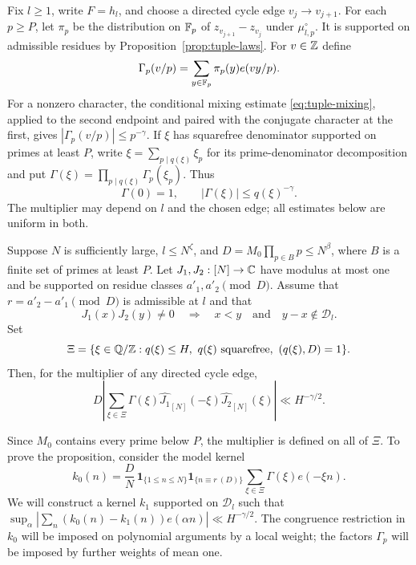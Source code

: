 Fix $l\ge1$, write $F=h_l$, and choose a directed cycle edge
$v_j\to v_{j+1}$.  For each $p\ge P$, let $\pi_p$ be the distribution on
$\mathbb F_p$ of $z_{v_{j+1}}-z_{v_j}$ under $\mu_{l,p}^\circ$.  It is
supported on admissible residues by Proposition~\ref{prop:tuple-laws}.
For $v\in\mathbb Z$ define
\[
 \Gamma_p(v/p)=\sum_{y\in\mathbb F_p}\pi_p(y)e(vy/p).
\]
For a nonzero character, the conditional mixing estimate
\eqref{eq:tuple-mixing}, applied to the second endpoint and paired with the
conjugate character at the first, gives $|\Gamma_p(v/p)|\le p^{-\gamma}$.
If $\xi$ has squarefree denominator supported on primes at least $P$, write
$\xi=\sum_{p\mid q(\xi)}\xi_p$ for its prime-denominator decomposition and
put $\Gamma(\xi)=\prod_{p\mid q(\xi)}\Gamma_p(\xi_p)$.  Thus
\begin{equation}\label{eq:edge-multiplier-bound}
 \Gamma(0)=1,\qquad |\Gamma(\xi)|\le q(\xi)^{-\gamma}.
\end{equation}
The multiplier may depend on $l$ and the chosen edge; all estimates below
are uniform in both.

\begin{proposition}\label{prop:pair-cancellation}
Suppose $N$ is sufficiently large, $l\le N^\zeta$, and
$D=M_0\prod_{p\in B}p\le N^\beta$, where $B$ is a finite set of primes at
least $P$.  Let $J_1,J_2:[N]\to\mathbb C$ have modulus at most one and be
supported on residue classes $a'_1,a'_2\pmod D$.  Assume that
$r=a'_2-a'_1\pmod D$ is admissible at $l$ and that
\[
 J_1(x)J_2(y)\ne0\quad\Longrightarrow\quad
 x<y\quad\text{and}\quad y-x\notin\mathcal D_l.
\]
Set
\[
 \Xi=\{\xi\in\mathbb Q/\mathbb Z:q(\xi)\le H,
       \ q(\xi)\text{ squarefree},\ (q(\xi),D)=1\}.
\]
Then, for the multiplier of any directed cycle edge,
\begin{equation}\label{eq:pair-cancellation}
 D\left|\sum_{\xi\in\Xi}\Gamma(\xi)
       \widehat{J_1}_{[N]}(-\xi)\widehat{J_2}_{[N]}(\xi)\right|
 \ll H^{-\gamma/2}.
\end{equation}
\end{proposition}

Since $M_0$ contains every prime below $P$, the multiplier is defined on all
of $\Xi$.  To prove the proposition, consider the model kernel
\begin{equation}\label{eq:model-kernel}
 k_0(n)=\frac DN\,
   \mathbf1_{\{1\le n\le N\}}\mathbf1_{\{n\equiv r\ (D)\}}
   \sum_{\xi\in\Xi}\Gamma(\xi)e(-\xi n).
\end{equation}
We will construct a kernel $k_1$ supported on $\mathcal D_l$ such that
$\sup_\alpha|\sum_n(k_0(n)-k_1(n))e(\alpha n)|\ll H^{-\gamma/2}$.
The congruence restriction
in $k_0$ will be imposed on polynomial arguments by a local weight; the
factors $\Gamma_p$ will be imposed by further weights of mean one.


